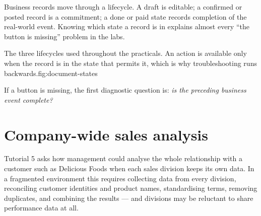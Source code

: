 Business records move through a lifecycle. A draft is editable; a confirmed or
posted record is a commitment; a done or paid state records completion of the
real-world event. Knowing which state a record is in explains almost every
``the button is missing'' problem in the labs.

\begin{utpfig}{The three lifecycles used throughout the
practicals. An action is available only when the record is in the state that
permits it, which is why troubleshooting runs
backwards.}{fig:document-states}
\end{utpfig}

If a button is missing, the first diagnostic question is: \emph{is the preceding
business event complete?}

\section{Company-wide sales analysis}

Tutorial 5 asks how management could analyse the whole relationship with a
customer such as Delicious Foods when each sales division keeps its own data.
In a fragmented environment this requires collecting data from every division,
reconciling customer identities and product names, standardising terms, removing
duplicates, and combining the results --- and divisions may be reluctant to
share performance data at all.

